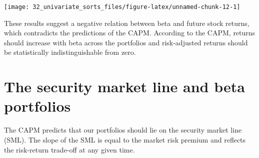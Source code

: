 \documentclass[
]{krantz}
\begin{document}
\begin{center}\texttt{[image: 32\_univariate\_sorts\_files/figure-latex/unnamed-chunk-12-1]} \end{center}

These results suggest a negative relation between beta and future stock returns, which contradicts the predictions of the CAPM. According to the CAPM, returns should increase with beta across the portfolios and risk-adjusted returns should be statistically indistinguishable from zero.

\hypertarget{the-security-market-line-and-beta-portfolios}{%
\section{The security market line and beta portfolios}\label{the-security-market-line-and-beta-portfolios}}

The CAPM predicts that our portfolios should lie on the security market line (SML). The slope of the SML is equal to the market risk premium and reflects the risk-return trade-off at any given time.
\end{document}
